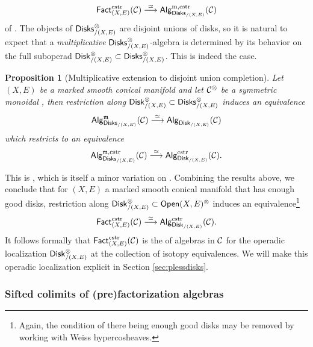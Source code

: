 \documentclass[10pt, reqno, twoside
, final
]{amsart}
\numberwithin{equation}{subsection}%
\theoremstyle{definition}
\theoremstyle{definition}
\theoremstyle{definition}
\theoremstyle{definition}
\theoremstyle{definition}
\theoremstyle{definition}
\theoremstyle{definition}
\theoremstyle{definition}
\theoremstyle{definition}
\theoremstyle{plain}
\theoremstyle{definition}
\theoremstyle{plain}
\theoremstyle{definition}
\theoremstyle{plain}
\theoremstyle{definition}
\theoremstyle{definition}
\theoremstyle{plain}
\theoremstyle{plain}
\theoremstyle{definition}
\theoremstyle{plain}
\theoremstyle{plain}
\newtheorem{prop}[defn]{Proposition}
\theoremstyle{plain}
\begin{document}
\[ \mathsf{Fact}^{\mathrm{cstr}}_{(X,E)}(\mathcal{C})\overset{\simeq}{\longrightarrow} \mathsf{Alg}^{\mathrm{m},\mathrm{cstr}}_{\mathsf{Disks}_{/(X,E)}}(\mathcal{C})   \]
of \infcatst. The objects of $\mathsf{Disks}_{/(X,E)}^{\otimes}$ are disjoint unions of disks, so it is natural to expect that a \emph{multiplicative} $\mathsf{Disks}_{/(X,E)}^{\otimes}$-algebra is determined by its behavior on the full suboperad $\mathsf{Disk}_{/(X,E)}^{\otimes}\subset \mathsf{Disks}_{/(X,E)}^{\otimes}$. This is indeed the case.
\begin{prop}[Multiplicative extension to disjoint union completion]
Let $(X,E)$ be a marked smooth conical manifold and let $\mathcal{C}^{\otimes}$ be a symmetric monoidal \infcatt, then restriction along $\mathsf{Disk}_{/(X,E)}^{\otimes}\subset\mathsf{Disks}_{/(X,E)}^{\otimes}$ induces an equivalence 
\[  \mathsf{Alg}^{\mathfrak{m}}_{\mathsf{Disks}_{/(X,E)}}(\mathcal{C})\overset{\simeq}{\longrightarrow} \mathsf{Alg}_{\mathsf{Disk}_{/(X,E)}}(\mathcal{C}) \]
which restricts to an equivalence
\[  \mathsf{Alg}^{\mathfrak{m},\mathrm{cstr}}_{\mathsf{Disks}_{/(X,E)}}(\mathcal{C})\overset{\simeq}{\longrightarrow} \mathsf{Alg}^{\mathrm{cstr}}_{\mathsf{Disk}_{/(X,E)}}(\mathcal{C}). \]
\end{prop}
This is \cite[Proposition 7.13]{KS}, which is itself a minor variation on \cite[Proposition 4.21]{KSW}. Combining the results above, we conclude that for $(X,E)$ a marked smooth conical manifold that has enough good disks, restriction along $\mathsf{Disk}_{/(X,E)}^{\otimes}\subset\mathsf{Open}(X,E)^{\otimes}$ induces an equivalence\footnote{Again, the condition of there being enough good disks may be removed by working with Weiss hypercosheaves.} 
\begin{equation}\label{eq:restricttodisk} \mathsf{Fact}^{\mathrm{cstr}}_{(X,E)}(\mathcal{C})\overset{\simeq}{\longrightarrow} \mathsf{Alg}^{\mathrm{cstr}}_{\mathsf{Disk}_{/(X,E)}}(\mathcal{C}).   \end{equation}
It follows formally that $\mathsf{Fact}^{\mathrm{cstr}}_{(X,E)}(\mathcal{C})$ is the \infcat of algebras in $\mathcal{C}$ for the operadic localization $\mathsf{Disk}_{/(X,E)}^{\otimes}$ at the collection of isotopy equivalences. We will make this operadic localization explicit in Section \ref{sec:plessdisks}.

\subsubsection{Sifted colimits of (pre)factorization algebras}
\end{document}
